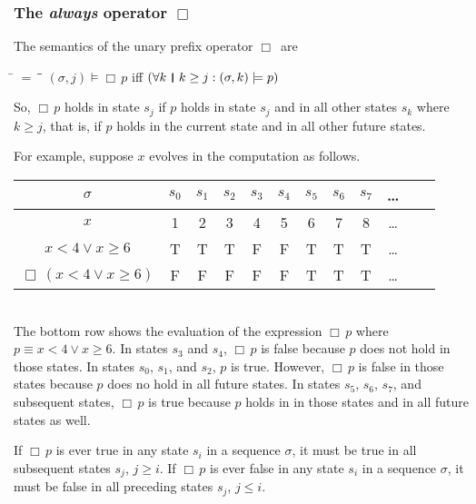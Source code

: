 \documentclass[12pt, fleqn, leqno]{article}
\newcommand{\lllgap}{12pt}                          %
\newcommand{\mymathindent}{24pt}                    %
\newcommand{\Always}{\Box\,}
\newcommand{\myqedtab}{\hspace{384pt}}              %
\newcommand{\thedr}{\rule[-.25ex]{.32mm}{1.75ex}}   %
\newcommand{\dr}{\;\,\thedr\,\;}                    %
\newcommand{\rb}{:}                                 %
\newcommand{\all}{\forall}                          %
\begin{document}
\subsubsection*{The \textit{always} operator $\Always$}

The semantics of the unary prefix operator $\Always$ are
\begin{tabbing}
\hspace{\mymathindent} \= $= \;$ \= \myqedtab \= \kill
  \> $(\sigma, j) \models \Always p$ \quad iff \quad $(\all k \dr k \ge j \rb (\sigma,k) \models p)$
\end{tabbing}
So, $\Always p$ holds in state $s_j$ if $p$ holds in state $s_j$ and in all other states $s_k$ where $k\ge j$,
that is, if $p$ holds in the current state and in all other future states.

For example, suppose $x$ evolves in the computation as follows.\\[\lllgap]
\begin{tabular}{c|ccccccccccc}
  $\sigma$                      & $s_0$ & $s_1$ & $s_2$ & $s_3$ & $s_4$ & $s_5$ & $s_6$ & $s_7$ & \dots \\
  \hline
  $x$                           & 1     & 2     & 3     & 4     & 5     & 6     & 7     & 8     &  \dots\\
  $x < 4 \lor x \ge 6$          & T     & T     & T     & F     & F     & T     & T     & T     &  \dots\\
  $\Always(x < 4 \lor x \ge 6)$ & F     & F     & F     & F     & F     & T     & T     & T     &  \dots\\
\end{tabular}\\[\lllgap]
The bottom row shows the evaluation of the expression $\Always p$ where $p\equiv x < 4 \lor x \ge 6$.
In states $s_3$ and $s_4$, $\Always p$ is false because $p$ does not hold in those states.
In states $s_0$, $s_1$, and $s_2$, $p$ is true. However, $\Always p$ is false in those states because $p$ does no hold
in all future states.
In states $s_5$, $s_6$, $s_7$, and subsequent states, $\Always p$ is true because $p$ holds in in those states
and in all future states as well.

If $\Always p$ is ever true in any state $s_i$ in a sequence $\sigma$, it must be true in all subsequent states $s_j$, $j\ge i$.
If $\Always p$ is ever false in any state $s_i$ in a sequence $\sigma$, it must be false in all preceding states $s_j$, $j\le i$.
\end{document}
